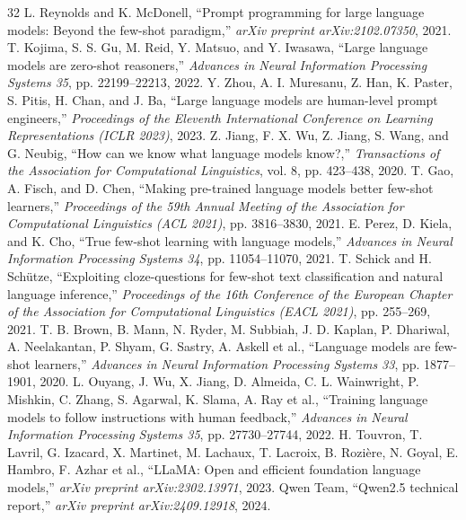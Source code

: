 \documentclass[10pt, conference, letterpaper]{IEEEtran}
\begin{document}
\begin{thebibliography}{32}
 L. Reynolds and K. McDonell, ``Prompt programming for large language models: Beyond the few-shot paradigm,'' \textit{arXiv preprint arXiv:2102.07350}, 2021.
 T. Kojima, S. S. Gu, M. Reid, Y. Matsuo, and Y. Iwasawa, ``Large language models are zero-shot reasoners,'' \textit{Advances in Neural Information Processing Systems 35}, pp. 22199--22213, 2022.
 Y. Zhou, A. I. Muresanu, Z. Han, K. Paster, S. Pitis, H. Chan, and J. Ba, ``Large language models are human-level prompt engineers,'' \textit{Proceedings of the Eleventh International Conference on Learning Representations (ICLR 2023)}, 2023.
 Z. Jiang, F. X. Wu, Z. Jiang, S. Wang, and G. Neubig, ``How can we know what language models know?,'' \textit{Transactions of the Association for Computational Linguistics}, vol. 8, pp. 423--438, 2020.
 T. Gao, A. Fisch, and D. Chen, ``Making pre-trained language models better few-shot learners,'' \textit{Proceedings of the 59th Annual Meeting of the Association for Computational Linguistics (ACL 2021)}, pp. 3816--3830, 2021.
 E. Perez, D. Kiela, and K. Cho, ``True few-shot learning with language models,'' \textit{Advances in Neural Information Processing Systems 34}, pp. 11054--11070, 2021.
 T. Schick and H. Sch{\"u}tze, ``Exploiting cloze-questions for few-shot text classification and natural language inference,'' \textit{Proceedings of the 16th Conference of the European Chapter of the Association for Computational Linguistics (EACL 2021)}, pp. 255--269, 2021.
 T. B. Brown, B. Mann, N. Ryder, M. Subbiah, J. D. Kaplan, P. Dhariwal, A. Neelakantan, P. Shyam, G. Sastry, A. Askell et al., ``Language models are few-shot learners,'' \textit{Advances in Neural Information Processing Systems 33}, pp. 1877--1901, 2020.
 L. Ouyang, J. Wu, X. Jiang, D. Almeida, C. L. Wainwright, P. Mishkin, C. Zhang, S. Agarwal, K. Slama, A. Ray et al., ``Training language models to follow instructions with human feedback,'' \textit{Advances in Neural Information Processing Systems 35}, pp. 27730--27744, 2022.
 H. Touvron, T. Lavril, G. Izacard, X. Martinet, M. Lachaux, T. Lacroix, B. Rozi{\`e}re, N. Goyal, E. Hambro, F. Azhar et al., ``LLaMA: Open and efficient foundation language models,'' \textit{arXiv preprint arXiv:2302.13971}, 2023.
 Qwen Team, ``Qwen2.5 technical report,'' \textit{arXiv preprint arXiv:2409.12918}, 2024.

\end{thebibliography}
\end{document}
